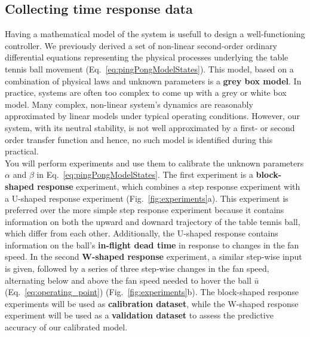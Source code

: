 \documentclass[10pt,twoside,openright]{article}
\begin{document}
\subsection{Collecting time response data}

Having a mathematical model of the system is usefull to design a well-functioning controller. We previously derived a set of non-linear second-order ordinary differential equations representing the physical processes underlying the table tennis ball movement (Eq.~\ref{eq:pingPongModelStates}). This model, based on a combination of physical laws and unknown parameters is a \textbf{grey box model}. In practice, systems are often too complex to come up with a grey or white box model. Many complex, non-linear system's dynamics are reasonably approximated by linear models under typical operating conditions. However, our system, with its neutral stability, is not well approximated by a first- or second order transfer function and hence, no such model is identified during this practical. \\

You will perform experiments and use them to calibrate the unknown parameters $\alpha$ and $\beta$ in Eq.~\ref{eq:pingPongModelStates}. The first experiment is a \textbf{block-shaped response} experiment, which combines a step response experiment with a U-shaped response experiment (Fig.~\ref{fig:experiments}a). This experiment is preferred over the more simple step response experiment because it contains information on both the upward and downard trajectory of the table tennis ball, which differ from each other. Additionally, the U-shaped response contains information on the ball's \textbf{in-flight dead time} in response to changes in the fan speed. In the second \textbf{W-shaped response} experiment, a similar step-wise input is given, followed by a series of three step-wise changes in the fan speed, alternating below and above the fan speed needed to hover the ball $\bar{u}$(Eq.~\ref{eq:operating_point}) (Fig.~\ref{fig:experiments}b). The block-shaped response experiments will be used as \textbf{calibration dataset}, while the W-shaped response experiment will be used as a \textbf{validation dataset} to assess the predictive accuracy of our calibrated model. \\
\end{document}
